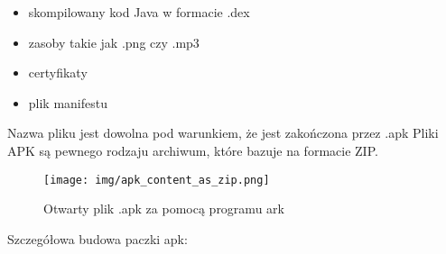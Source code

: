 \documentclass[12pt,a4paper,leqno,oneside,titlepage]{book}
\begin{document}
\begin{itemize}
\item skompilowany kod Java w formacie .dex
\item zasoby takie jak .png czy .mp3
\item certyfikaty
\item plik manifestu
\end{itemize}
Nazwa pliku jest dowolna pod warunkiem, że jest zakończona przez .apk
Pliki APK są pewnego rodzaju archiwum, które bazuje na formacie ZIP.

\begin{figure}[H]
	\centering
	\texttt{[image: img/apk\_content\_as\_zip.png]}
	\caption{Otwarty plik .apk za pomocą programu ark}
\end{figure}

Szczegółowa budowa paczki apk:
\end{document}
